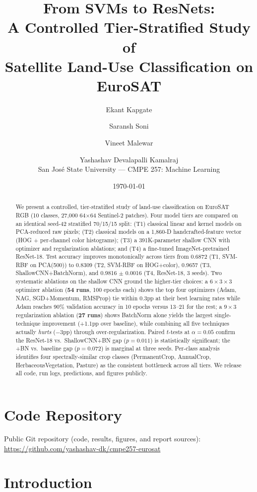 \documentclass[10pt,letterpaper]{article}
\title{From SVMs to ResNets: \\ A Controlled Tier-Stratified Study of \\
Satellite Land-Use Classification on EuroSAT}
\author{Ekant Kapgate \and Saransh Soni \and Vineet Malewar \and Yashashav Devalapalli Kamalraj \\
\small{San Jos\'{e} State University --- CMPE 257: Machine Learning}}
\date{\today}
\begin{document}
\maketitle

\section*{Code Repository}
Public Git repository (code, results, figures, and report sources): \url{https://github.com/yashashav-dk/cmpe257-eurosat}

\begin{abstract}
We present a controlled, tier-stratified study of land-use classification on EuroSAT RGB (10 classes, 27{,}000 64$\times$64 Sentinel-2 patches). Four model tiers are compared on an identical seed-42 stratified 70/15/15 split: (T1) classical linear and kernel models on PCA-reduced raw pixels; (T2) classical models on a 1{,}860-D handcrafted-feature vector (HOG + per-channel color histograms); (T3) a 391K-parameter shallow CNN with optimizer and regularization ablations; and (T4) a fine-tuned ImageNet-pretrained ResNet-18. Test accuracy improves monotonically across tiers from 0.6872 (T1, SVM-RBF on PCA(500)) to 0.8309 (T2, SVM-RBF on HOG+color), 0.9657 (T3, ShallowCNN+BatchNorm), and 0.9816 $\pm$ 0.0016 (T4, ResNet-18, 3 seeds). Two systematic ablations on the shallow CNN ground the higher-tier choices: a $6 \times 3 \times 3$ optimizer ablation (\textbf{54 runs}, 100 epochs each) shows the top four optimizers (Adam, NAG, SGD+Momentum, RMSProp) tie within 0.3pp at their best learning rates while Adam reaches 90\% validation accuracy in 10 epochs versus 13--21 for the rest; a $9 \times 3$ regularization ablation (\textbf{27 runs}) shows BatchNorm alone yields the largest single-technique improvement (+1.1pp over baseline), while combining all five techniques actually \emph{hurts} (\hbox{$-3$pp}) through over-regularization. Paired $t$-tests at $\alpha{=}0.05$ confirm the ResNet-18 vs.\ ShallowCNN+BN gap ($p{=}0.011$) is statistically significant; the +BN vs.\ baseline gap ($p{=}0.072$) is marginal at three seeds. Per-class analysis identifies four spectrally-similar crop classes (PermanentCrop, AnnualCrop, HerbaceousVegetation, Pasture) as the consistent bottleneck across all tiers. We release all code, run logs, predictions, and figures publicly.
\end{abstract}

\tableofcontents
\newpage

\section{Introduction}
\end{document}
